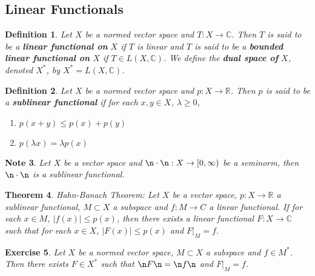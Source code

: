\documentclass[12pt]{amsart}
\newtheorem{thm}{Theorem}[subsection]
\newtheorem{defn}[thm]{Definition}
\newtheorem{note}[thm]{Note}
\newtheorem{ex}[thm]{Exercise}
\newcommand{\lam}{\lambda}
\newcommand{\C}{\mathbb{C}}
\newcommand{\R}{\mathbb{R}}
\newcommand{\Rg}{[0,\infty)}
\begin{document}
\subsection{Linear Functionals}

\begin{defn}
	Let $X$ be a normed vector space and $T :X \rightarrow \C$. Then $T$ is said to be a \textbf{linear functional on} $X$ if $T$ is linear and $T$ is said to be a \textbf{bounded linear functional on} $X$ if $T \in L(X, \C)$. We define the \textbf{dual space of} $X$, denoted $X^*$, by $X^* = L(X, \C)$.
\end{defn}

\begin{defn}
	Let $X$ be a normed vector space and $p:X \rightarrow \R$. Then $p$ is said to be a \textbf{sublinear functional} if for each $x,y \in X$, $\lam \geq 0$, 
	\begin{enumerate}
		\item $p(x+y) \leq p(x) + p(y)$
		\item $p(\lam x ) = \lam p(x)$
	\end{enumerate}  
\end{defn}

\begin{note}
	Let $X$ be a vector space and $\n \cdot \n : X \rightarrow \Rg$ be a seminorm, then $\n \cdot \n$ is a sublinear functional.
\end{note}

\begin{thm}{Hahn-Banach Theorem:}
	Let $X$ be a vector space, $p:X \rightarrow \R$ a sublinear functional, $M \subset X$ a subspace and $f:M \rightarrow C$ a linear functional. If for each $x \in M$, $\vert f(x) \vert \leq p(x)$, then there exists a linear functional $F:X \rightarrow \C$ such that for each $x \in X$, $\vert F(x) \vert \leq p(x)$ and $F|_{M}=f$.
\end{thm}

\begin{ex}
	Let $X$ be a normed vector space, $M \subset X$ a subspace and $f \in M^*$. Then there exists $F \in X^*$ such that $\n F \n = \n f \n$ and $F|_M = f$.  
\end{ex}
\end{document}
